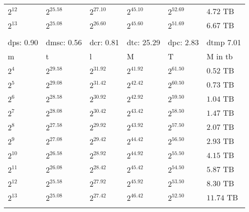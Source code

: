 \begin{tabular}{llllll}
$2^{12}$ & $2^{25.58}$ & $2^{27.10}$ & $2^{45.10}$ & $2^{52.69}$ & $4.72$ TB \\
$2^{13}$ & $2^{25.08}$ & $2^{26.60}$ & $2^{45.60}$ & $2^{51.69}$ & $6.67$ TB \\
 &  &  &  &  &  \\
dps: 0.90 & dmsc: 0.56 & dcr: 0.81 & dtc: 25.29 & dpc: 2.83 & dtmp 7.01 \\
m & t & l & M & T & M in tb \\
$2^{4}$ & $2^{29.58}$ & $2^{31.92}$ & $2^{41.92}$ & $2^{61.50}$ & $0.52$ TB \\
$2^{5}$ & $2^{29.08}$ & $2^{31.42}$ & $2^{42.42}$ & $2^{60.50}$ & $0.73$ TB \\
$2^{6}$ & $2^{28.58}$ & $2^{30.92}$ & $2^{42.92}$ & $2^{59.50}$ & $1.04$ TB \\
$2^{7}$ & $2^{28.08}$ & $2^{30.42}$ & $2^{43.42}$ & $2^{58.50}$ & $1.47$ TB \\
$2^{8}$ & $2^{27.58}$ & $2^{29.92}$ & $2^{43.92}$ & $2^{57.50}$ & $2.07$ TB \\
$2^{9}$ & $2^{27.08}$ & $2^{29.42}$ & $2^{44.42}$ & $2^{56.50}$ & $2.93$ TB \\
$2^{10}$ & $2^{26.58}$ & $2^{28.92}$ & $2^{44.92}$ & $2^{55.50}$ & $4.15$ TB \\
$2^{11}$ & $2^{26.08}$ & $2^{28.42}$ & $2^{45.42}$ & $2^{54.50}$ & $5.87$ TB \\
$2^{12}$ & $2^{25.58}$ & $2^{27.92}$ & $2^{45.92}$ & $2^{53.50}$ & $8.30$ TB \\
$2^{13}$ & $2^{25.08}$ & $2^{27.42}$ & $2^{46.42}$ & $2^{52.50}$ & $11.74$ TB \\
 &  &  &  &  &  \\
\end{tabular}